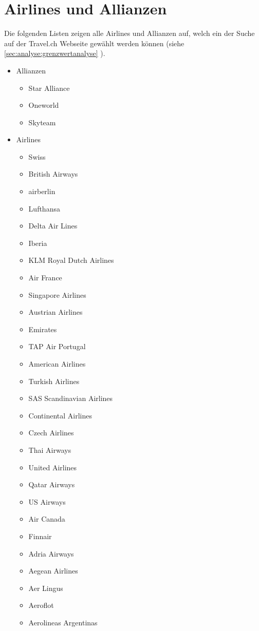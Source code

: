 \chapter{Airlines und Allianzen}
\label{app:airlines}
Die folgenden Listen zeigen alle Airlines und Allianzen auf, welch ein der Suche auf der Travel.ch Webseite gewählt werden können (siehe \cref{sec:analyse:grenzwertanalyse} ).
\begin{itemize}
\item Allianzen
	\begin{itemize}
	\item Star Alliance
	\item Oneworld
	\item Skyteam
	\end{itemize}
\item Airlines
	\begin{itemize}
	\item Swiss
	\item British Airways
	\item airberlin
	\item Lufthansa
	\item Delta Air Lines
	\item Iberia
	\item KLM Royal Dutch Airlines
	\item Air France
	\item Singapore Airlines
	\item Austrian Airlines
	\item Emirates
	\item TAP Air Portugal
	\item American Airlines
	\item Turkish Airlines
	\item SAS Scandinavian Airlines
	\item Continental Airlines
	\item Czech Airlines
	\item Thai Airways
	\item United Airlines
	\item Qatar Airways
	\item US Airways
	\item Air Canada
	\item Finnair
	\item Adria Airways
	\item Aegean Airlines
	\item Aer Lingus
	\item Aeroflot
	\item Aerolineas Argentinas

\end{itemize}
\end{itemize}

